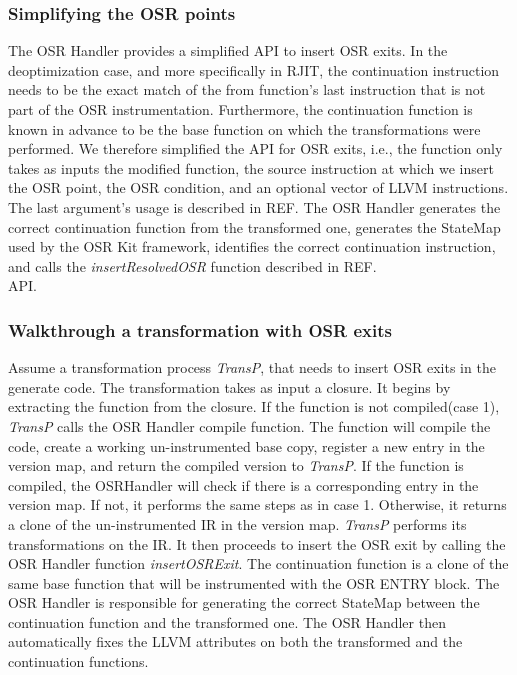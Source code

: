 \subsubsection{Simplifying the OSR points}
The OSR Handler provides a simplified API to insert OSR exits.
In the deoptimization case, and more specifically in RJIT, the continuation instruction needs to be the exact match of the from function's last instruction that is not part of the OSR instrumentation.
Furthermore, the continuation function is known in advance to be the base function on which the transformations were performed.
We therefore simplified the API for OSR exits, i.e., the function only takes as inputs the modified function, the source instruction at which we insert the OSR point, the OSR condition, and an optional vector of LLVM instructions.
The last argument's usage is described in REF.
The OSR Handler generates the correct continuation function from the transformed one, generates the StateMap used by the OSR Kit framework, identifies the correct continuation instruction, and calls the \textit{insertResolvedOSR} function described in REF.\\

API.\\

\subsubsection{Walkthrough a transformation with OSR exits}
Assume a transformation process \textit{TransP}, that needs to insert OSR exits in the generate code.
The transformation takes as input a closure.
It begins by extracting the function from the closure. 
If the function is not compiled(case 1), \textit{TransP} calls the OSR Handler compile function.
The function will compile the code, create a working un-instrumented base copy, register a new entry in the version map, and return the compiled version to \textit{TransP}.
If the function is compiled, the OSRHandler will check if there is a corresponding entry in the version map. 
If not, it performs the same steps as in case 1.
Otherwise, it returns a clone of the un-instrumented IR in the version map.
\textit{TransP} performs its transformations on the IR.
It then proceeds to insert the OSR exit by calling the OSR Handler function \textit{insertOSRExit}.
The continuation function is a clone of the same base function that will be instrumented with the OSR ENTRY block.
The OSR Handler is responsible for generating the correct StateMap between the continuation function and the transformed one.
The OSR Handler then automatically fixes the LLVM attributes on both the transformed and the continuation functions.\\

